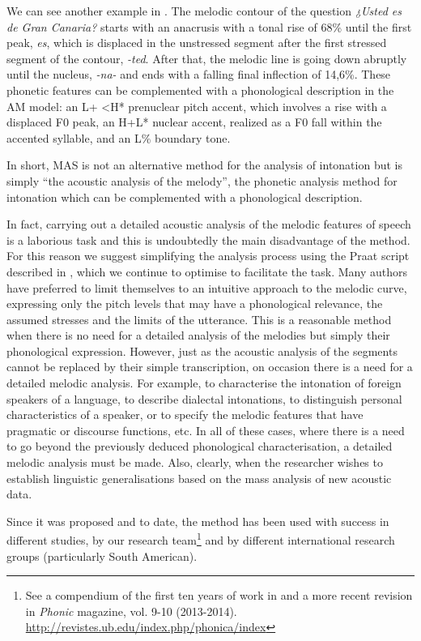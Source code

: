 \documentclass[output=paper]{langscibook}
\begin{document}
We can see another example in . The melodic contour of the question \textit{¿Usted es de Gran Canaria?} starts with an anacrusis with a tonal rise of 68\% until the first peak, \textit{es}, which is displaced in the unstressed segment after the first stressed segment of the contour, \textit{-ted}. After that, the melodic line is going down abruptly until the nucleus, \textit{-na-} and ends with a falling final inflection of 14,6\%. These phonetic features can be complemented with a phonological description in the AM model: an L+ <H* prenuclear pitch accent, which involves a rise with a displaced F0 peak, an H+L* nuclear accent, realized as a F0 fall within the accented syllable, and an L\% boundary tone. 

In short, MAS is not an alternative method for the analysis of intonation but is simply ``the acoustic analysis of the melody'', the phonetic analysis method for intonation which can be complemented with a phonological description.

In fact, carrying out a detailed acoustic analysis of the melodic features of speech is a laborious task and this is undoubtedly the main disadvantage of the method. For this reason we suggest simplifying the analysis process using the Praat script described in , which we continue to optimise to facilitate the task. Many authors have preferred to limit themselves to an intuitive approach to the melodic curve, expressing only the pitch levels that may have a phonological relevance, the assumed stresses and the limits of the utterance. This is a reasonable method when there is no need for a detailed analysis of the melodies but simply their phonological expression. However, just as the acoustic analysis of the segments cannot be replaced by their simple transcription, on occasion there is a need for a detailed melodic analysis. For example, to characterise the intonation of foreign speakers of a language, to describe dialectal intonations, to distinguish personal characteristics of a speaker, or to specify the melodic features that have pragmatic or discourse functions, etc. In all of these cases, where there is a need to go beyond the previously deduced phonological characterisation, a detailed melodic analysis must be made. Also, clearly, when the researcher wishes to establish linguistic generalisations based on the mass analysis of new acoustic data.

Since it was proposed \citep{CanteroSerena.1999} and to date, the method has been used with success in different studies, by our research team\footnote{See a compendium of the first ten years of work in \citet{VariousAuthors.2009} and a more recent revision in \textit{Phonic} magazine, vol. 9-10 (2013-2014). \url{http://revistes.ub.edu/index.php/phonica/index}} and by different international research groups (particularly South American).
\end{document}
